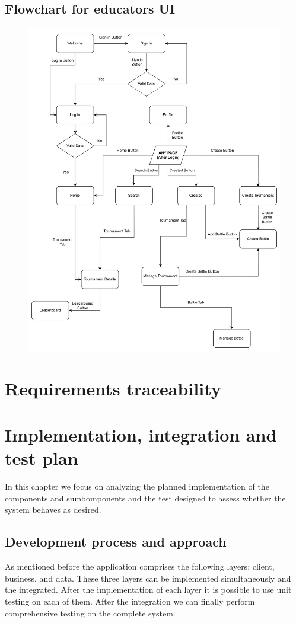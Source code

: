 \documentclass[12pt, a4paper]{report}
\begin{document}
    \section{Flowchart for educators UI}
    \begin{figure}[H]
        \centering
        \includegraphics[width=0.9\linewidth]{images/educators_UI.png}
    \end{figure}

\chapter{Requirements traceability}



\chapter{Implementation, integration and test plan}
    In this chapter we focus on analyzing the planned implementation of the components and sumbomponents and the test designed to assess whether the system behaves as desired.

    \section{Development process and approach}
    As mentioned before the application comprises the following layers: client, business, and data. 
    These three layers can be implemented simultaneously and the integrated. 
    After the implementation of each layer it is possible to use unit testing on each of them. 
    After the integration we can finally perform comprehensive testing on the complete system. 
\end{document}
